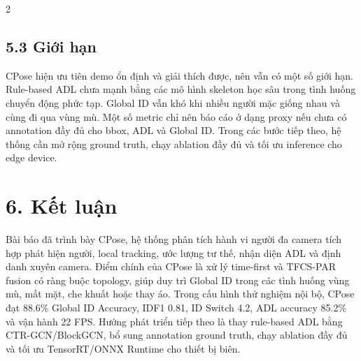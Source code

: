 \documentclass[a4paper, twoside, 10pt]{article}
\begin{document}
\begin{multicols}{2}
\subsection*{5.3 Giới hạn}
CPose hiện ưu tiên demo ổn định và giải thích được, nên vẫn có một số giới hạn. Rule-based ADL chưa mạnh bằng các mô hình skeleton học sâu trong tình huống chuyển động phức tạp. Global ID vẫn khó khi nhiều người mặc giống nhau và cùng đi qua vùng mù. Một số metric chỉ nên báo cáo ở dạng proxy nếu chưa có annotation đầy đủ cho bbox, ADL và Global ID. Trong các bước tiếp theo, hệ thống cần mở rộng ground truth, chạy ablation đầy đủ và tối ưu inference cho edge device.

\section*{6. Kết luận}
Bài báo đã trình bày CPose, hệ thống phân tích hành vi người đa camera tích hợp phát hiện người, local tracking, ước lượng tư thế, nhận diện ADL và định danh xuyên camera. Điểm chính của CPose là xử lý time-first và TFCS-PAR fusion có ràng buộc topology, giúp duy trì Global ID trong các tình huống vùng mù, mất mặt, che khuất hoặc thay áo. Trong cấu hình thử nghiệm nội bộ, CPose đạt 88.6\% Global ID Accuracy, IDF1 0.81, ID Switch 4.2, ADL accuracy 85.2\% và vận hành 22 FPS. Hướng phát triển tiếp theo là thay rule-based ADL bằng CTR-GCN/BlockGCN, bổ sung annotation ground truth, chạy ablation đầy đủ và tối ưu TensorRT/ONNX Runtime cho thiết bị biên.


\end{multicols}
\end{document}
